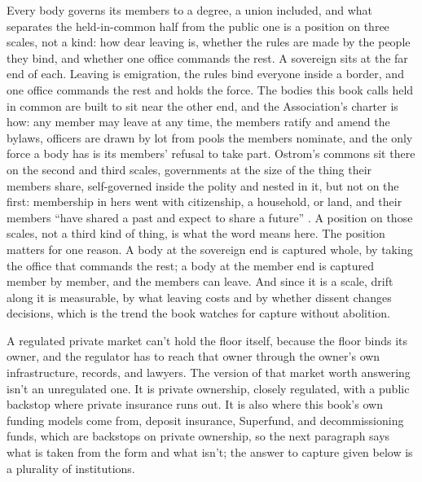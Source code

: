 Every body governs its members to a degree, a union included, and what separates the held-in-common half from the public one is a position on three scales, not a kind: how dear leaving is, whether the rules are made by the people they bind, and whether one office commands the rest. A sovereign sits at the far end of each. Leaving is emigration, the rules bind everyone inside a border, and one office commands the rest and holds the force. The bodies this book calls held in common are built to sit near the other end, and the Association's charter is how: any member may leave at any time, the members ratify and amend the bylaws, officers are drawn by lot from pools the members nominate, and the only force a body has is its members' refusal to take part. Ostrom's commons sit there on the second and third scales, governments at the size of the thing their members share, self-governed inside the polity and nested in it, but not on the first: membership in hers went with citizenship, a household, or land, and their members “have shared a past and expect to share a future” \autocite{ostrom1990governing}. A position on those scales, not a third kind of thing, is what the word means here. The position matters for one reason. A body at the sovereign end is captured whole, by taking the office that commands the rest; a body at the member end is captured member by member, and the members can leave. And since it is a scale, drift along it is measurable, by what leaving costs and by whether dissent changes decisions, which is the trend the book watches for capture without abolition.

A regulated private market can't hold the floor itself, because the floor binds its owner, and the regulator has to reach that owner through the owner's own infrastructure, records, and lawyers.
The version of that market worth answering isn't an unregulated one. It is private ownership, closely regulated, with a public backstop where private insurance runs out.
It is also where this book's own funding models come from, deposit insurance, Superfund, and decommissioning funds, which are backstops on private ownership, so the next paragraph says what is taken from the form and what isn't; the answer to capture given below is a plurality of institutions.

